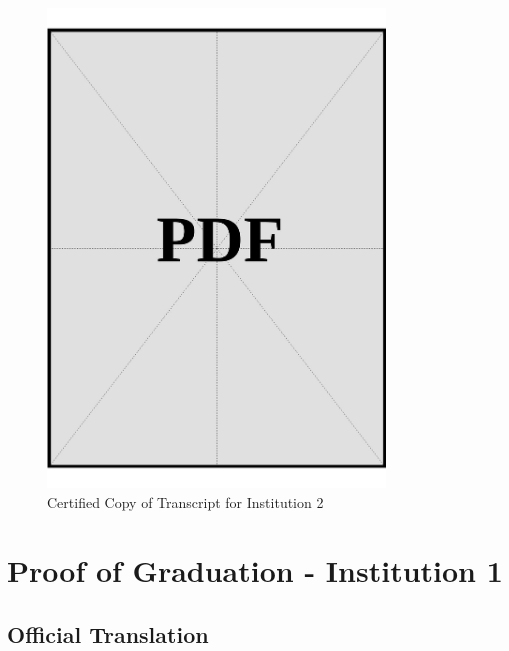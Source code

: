 \begin{figure}[h]
    \centering
    \includegraphics[page=1, width=0.8\textwidth]{../application-docs/applicant/post-secondary-institutions/institution-2/transcript/certified-copies.pdf}
    \caption{Certified Copy of Transcript for Institution 2}
    \label{fig:institution-2-transcript-certified-copy}
\end{figure}

\vspace*{\fill}
\clearpage


\section{Proof of Graduation - Institution 1}\label{sec:institution-1-proof-of-graduation}

\subsection*{Official Translation}
\vspace*{\fill}


